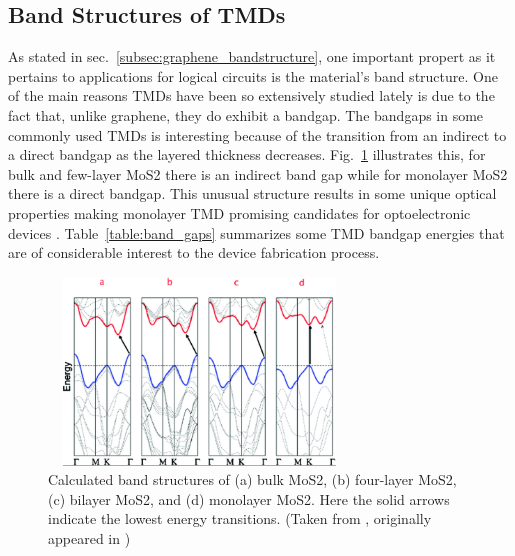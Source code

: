 \subsection{Band Structures of \acp{TMD}}\label{subsec:tmd_properties}
\noindent As stated in sec.~\ref{subsec:graphene_bandstructure}, one important propert as it pertains to applications for logical circuits is the material's band structure. One of the main reasons \acp{TMD} have been so extensively studied lately is due to the fact that, unlike graphene, they do exhibit a bandgap. The bandgaps in some commonly used \acp{TMD} is interesting because of the transition from an indirect to a direct bandgap as the layered thickness decreases. Fig.~\ref{fig:mos2_bandstructure} illustrates this, for bulk and few-layer \acs{MoS2} there is an indirect band gap while for monolayer \acs{MoS2} there is a direct bandgap. This unusual structure results in some unique optical properties making monolayer \acs{TMD} promising candidates for optoelectronic devices \cite{Cheng_NanoLett2014,Conley_NanoLett2013}. Table~\ref{table:band_gaps} summarizes some \acs{TMD} bandgap energies that are of considerable interest to the device fabrication process. 
\begin{figure}[ht]
	\centering
	\includegraphics[height=5cm,width=8cm]{figs/intro/mos2_bandstructure}
	\caption[Band structures of \acs{MoS2}]{Calculated band structures of (a) bulk \acs{MoS2}, (b) four-layer \acs{MoS2}, (c) bilayer \acs{MoS2}, and (d) monolayer \acs{MoS2}. Here the solid arrows indicate the lowest energy transitions. (Taken from \cite{Lee_Nanoscale2014}, originally appeared in \cite{Splendiani_Nanolett2010})}
	\label{fig:mos2_bandstructure}
\end{figure}

